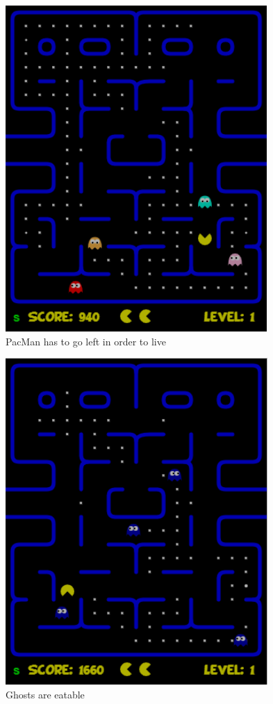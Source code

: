 \begin{figure}[!h]
	\centering
	\includegraphics[scale=0.55]{pictures/Pacman_Condition3.PNG}
	\caption{PacMan has to go left in order to live}
	\label{fig:pacmanLeft}
\end{figure}
\begin{figure}[!h]
	\centering
	\includegraphics[scale=0.55]{pictures/Pacman_Condition4.PNG}
	\caption{Ghosts are eatable}
	\label{fig:pacmanEatable}
\end{figure}
